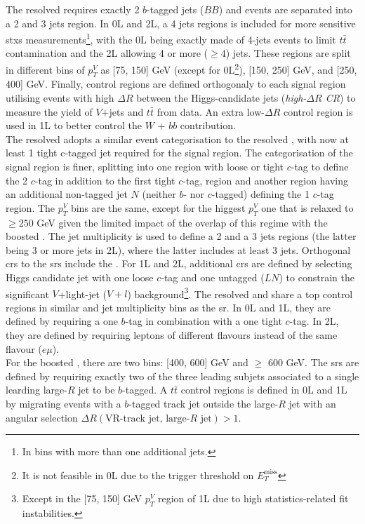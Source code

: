 The resolved \vhb requires exactly 2 $b$-tagged jets ($BB$) and events are separated into a 2 and 3 jets region. In 0L and 2L, a 4 jets regions is included for more sensitive \gls{stxs} measurements\footnote{In bins with more than one additional jets.}, with the 0L being exactly made of 4-jets events to limit $t\bar{t}$ contamination and the 2L allowing 4 or more ($\geq 4$) jets. These regions are split in different bins of $p_T^V$ as [75, 150] GeV (except for 0L\footnote{It is not feasible in 0L due to the trigger threshold on $E_T^{\textrm{miss}}$}), [150, 250] GeV, and [250, 400] GeV. Finally, control regions are defined orthogonaly to each signal region utilising events with high $\Delta R$ between the Higgs-candidate jets (\textit{high-$\Delta R$ CR}) to measure the yield of $V$+jets and $t\bar{t}$ from data. An extra low-$\Delta R$ control region is used in 1L to better control the $W$ + $bb$ contribution.\\

The resolved \vhc adopts a similar event categorisation to the resolved \vhb, with now at least 1 tight c-tagged jet required for the signal region. The categorisation of the signal region is finer, splitting into one region with loose or tight $c$-tag to define the 2 $c$-tag in addition to the first tight $c$-tag, region and another region having an additional non-tagged jet $N$ (neither $b$- nor $c$-tagged) defining the 1 $c$-tag region. The $p_T^V$ bins are the same, except for the higgest $p_T^V$ one that is relaxed to $\geq 250$ GeV given the limited impact of the overlap of this regime with the boosted \vhb. The jet multiplicity is used to define a 2 and a 3 jets regions (the latter being 3 or more jets in 2L), where the latter includes at least 3 jets. Orthogonal \gls{cr}s to the \gls{sr}s include the \highdr. For 1L and 2L, additional \gls{cr}s are defined by selecting Higgs candidate jet with one loose $c$-tag and one untagged ($LN$) to constrain the significant $V$+light-jet ($V+l$) background\footnote{Except in the [75, 150] GeV $p_T^V$ region of 1L due to high statistics-related fit instabilities.}. The resolved \vhb and \vhc share a top control regions in similar \ptv and jet multiplicity bins as the \gls{sr}. In 0L and 1L, they are defined by requiring a one $b$-tag in combination with a one tight $c$-tag. In 2L, they are defined by requiring leptons of different flavours instead of the same flavour ($e\mu$).\\

For the boosted \vhb, there are two \ptv bins: [400, 600] GeV and $\geq$ 600 GeV. The \gls{sr}s are defined by requiring exactly two of the three leading subjets associated to a single learding large-$R$ jet to be $b$-tagged. A $t\bar{t}$ control regions is defined in 0L and 1L by migrating events with a $b$-tagged track jet outside the large-$R$ jet with an angular selection $\Delta R(\textrm{VR-track jet, large-}R\textrm{ jet}) > 1$. \\

